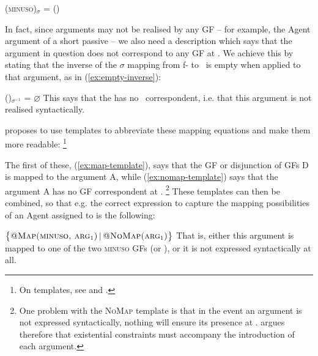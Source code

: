 \documentclass[output=paper]{langscibook}
\begin{document}
\ea\label{ex:das-equivalent-disjunction}%
(\UP \textsc{minuso})$_\sigma$ = (\UPS {})%
\z

In fact, since arguments may not be realised by any GF -- for example, the Agent
argument of a short passive -- we also need a description which says that the
argument in question does not correspond to any GF at \fstruc. We achieve this
by stating that the inverse of the $\sigma$ mapping from f- to \sstruc\ is empty
when applied to that argument, as in (\ref{ex:empty-inverse}):

\ea\label{ex:empty-inverse}%
(\UPS {})$_{\sigma^{-1}}$ = $\varnothing$%
\z
%
This says that the \sstruc{}  has no \fstruc\ correspondent, i.e. that
this argument is not realised syntactically.


\citet[319, 321]{findlay2017mapping} proposes to use templates to abbreviate
these mapping equations and make them more readable:%
%
\footnote{On templates, see
  \citet{dalrymple2004linguistic,xledoc,asudeh2013constructions} and
  .}
%

\ea\label{ex:map-template}
\ex\label{ex:nomap-template}
\z
%
The first of these, (\ref{ex:map-template}), says that the GF or disjunction of
GFs D is mapped to the \sstruc{} argument A, while (\ref{ex:nomap-template})
says that the \sstruc{} argument A has no GF correspondent at \fstruc{}.%
%
\footnote{One problem with the \textsc{NoMap} template is that in the event an
  argument is not expressed syntactically, nothing will ensure its presence at
  \sstruc{}. \citet[135--136]{Findlay2020} argues therefore that existential
  constraints must accompany the introduction of each argument.}
%
These templates can then be combined, so that e.g. the correct expression to
capture the mapping possibilities of an Agent assigned to  is the
following:

\ea\label{ex:mapping-full}
$\big\{\textsc{@Map(minuso, \textsc{arg}\textsubscript{1})}\, \vert\, \textsc{@NoMap(\textsc{arg}\textsubscript{1})}\big\}$
\z
%
That is, either this argument is mapped to one of the two \textsc{minuso} GFs
(\SUBJ or \OBLTHETA), or it is not expressed syntactically at all.
\end{document}
